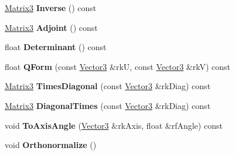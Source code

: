 \begin{DoxyCompactItemize}
\item 
\hyperlink{class_i_dream_sky_1_1_matrix3}{Matrix3} {\bfseries Inverse} () const \hypertarget{class_i_dream_sky_1_1_matrix3_abe03e5679aeb231489dc170a76b0efdc}{}\label{class_i_dream_sky_1_1_matrix3_abe03e5679aeb231489dc170a76b0efdc}

\item 
\hyperlink{class_i_dream_sky_1_1_matrix3}{Matrix3} {\bfseries Adjoint} () const \hypertarget{class_i_dream_sky_1_1_matrix3_a603fdea4a2d026c9eb64959b08d519d7}{}\label{class_i_dream_sky_1_1_matrix3_a603fdea4a2d026c9eb64959b08d519d7}

\item 
float {\bfseries Determinant} () const \hypertarget{class_i_dream_sky_1_1_matrix3_a004ef65ae71e3afa987d6ed0090dd223}{}\label{class_i_dream_sky_1_1_matrix3_a004ef65ae71e3afa987d6ed0090dd223}

\item 
float {\bfseries Q\+Form} (const \hyperlink{class_i_dream_sky_1_1_vector3}{Vector3} \&rkU, const \hyperlink{class_i_dream_sky_1_1_vector3}{Vector3} \&rkV) const \hypertarget{class_i_dream_sky_1_1_matrix3_a45093207be6c6fd4e5a5e4755e8a89ac}{}\label{class_i_dream_sky_1_1_matrix3_a45093207be6c6fd4e5a5e4755e8a89ac}

\item 
\hyperlink{class_i_dream_sky_1_1_matrix3}{Matrix3} {\bfseries Times\+Diagonal} (const \hyperlink{class_i_dream_sky_1_1_vector3}{Vector3} \&rk\+Diag) const \hypertarget{class_i_dream_sky_1_1_matrix3_a0e4f4b02e6420fabda15b2a2de4c9b53}{}\label{class_i_dream_sky_1_1_matrix3_a0e4f4b02e6420fabda15b2a2de4c9b53}

\item 
\hyperlink{class_i_dream_sky_1_1_matrix3}{Matrix3} {\bfseries Diagonal\+Times} (const \hyperlink{class_i_dream_sky_1_1_vector3}{Vector3} \&rk\+Diag) const \hypertarget{class_i_dream_sky_1_1_matrix3_a578e7c96e639eaee5b9f46c19cb08c13}{}\label{class_i_dream_sky_1_1_matrix3_a578e7c96e639eaee5b9f46c19cb08c13}

\item 
void {\bfseries To\+Axis\+Angle} (\hyperlink{class_i_dream_sky_1_1_vector3}{Vector3} \&rk\+Axis, float \&rf\+Angle) const \hypertarget{class_i_dream_sky_1_1_matrix3_ac19011f9fa179f1874ace4d0f16f55dc}{}\label{class_i_dream_sky_1_1_matrix3_ac19011f9fa179f1874ace4d0f16f55dc}

\item 
void {\bfseries Orthonormalize} ()\hypertarget{class_i_dream_sky_1_1_matrix3_a8c7d501c01975a61298fc38a8b933f6f}{}\label{class_i_dream_sky_1_1_matrix3_a8c7d501c01975a61298fc38a8b933f6f}


\end{DoxyCompactItemize}
